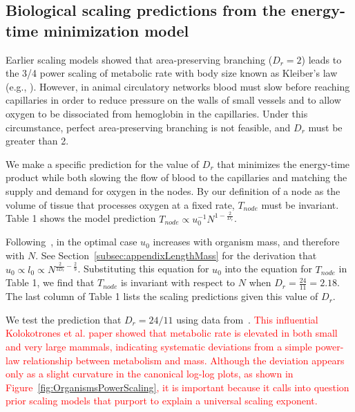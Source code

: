 \documentclass[12pt]{article}
\newcommand{\red}[1]{\textcolor{red}{#1}}
\begin{document}
\newpage
\subsection{Biological scaling predictions from the energy-time minimization model}
\label{sec:bio-predictions}

Earlier scaling models showed that area-preserving
branching ($D_r = 2$) leads to the 3/4 power scaling of metabolic rate with body
size known as Kleiber's law (e.g., \cite{west97, banavar10}).
However, in animal circulatory networks blood must slow before reaching capillaries in order to
reduce pressure on the walls of small vessels and to allow oxygen to be
dissociated from hemoglobin in the capillaries.   Under this circumstance,
perfect area-preserving branching is not feasible, and $D_r$ must be greater than 2.

We make a specific prediction for the value of $D_r$ that minimizes the energy-time product while both slowing the flow of blood to the capillaries and matching the supply and demand for oxygen in the nodes. By our definition of a node as the volume of tissue that processes oxygen at a fixed rate, $T_{node}$ must be invariant. Table 1 shows the model prediction $T_{node} \propto u_0^{-1}N^{1-\frac{2}{D_r}}$.

Following~\cite{banavar10}, in the optimal case $u_0$ increases with organism mass, and therefore with $N$. See Section~\ref{subsec:appendixLengthMass} for the derivation that $u_0 \propto l_0 \propto N^{\frac{2}{3D_r} - \frac{2}{9}}$. Substituting this equation for $u_0$ into the equation for $T_{node}$ in Table 1, we find that $T_{node}$ is invariant with respect to $N$ when $D_r = \frac{24}{11} = 2.18$. The last column of Table 1 lists the scaling predictions given this value of $D_r$. 

We test the prediction that $D_r = 24/11$ using data from~\cite{kolokotrones2010curvature}.
\red{This influential Kolokotrones et al. paper showed that metabolic rate is elevated in both small and very large mammals, indicating systematic
deviations from a simple power-law relationship between metabolism and
mass.  Although the deviation appears only as a slight curvature in the canonical log-log
plots, as shown in Figure~\ref{fig:OrganismsPowerScaling}, it is important because it calls into question prior scaling models that purport to explain a universal scaling exponent.}
\end{document}
